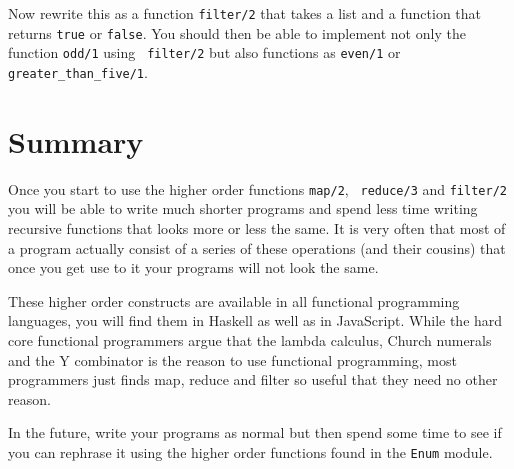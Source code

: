 \documentclass[a4paper,11pt]{article}
\begin{document}
Now rewrite this as a function {\tt filter/2} that takes a list and a
function that returns {\tt true} or {\tt false}. You should then be
able to implement not only the function {\tt odd/1} using {\tt
  filter/2} but also functions as {\tt even/1} or {\tt
  greater_than_five/1}.



\section*{Summary}

Once you start to use the higher order functions {\tt map/2}, {\tt
  reduce/3} and {\tt filter/2} you will be able to write much shorter
programs and spend less time writing recursive functions that looks
more or less the same. It is very often that most of a program actually
consist of a series of these operations (and their cousins) that once
you get use to it your programs will not look the same.

These higher order constructs are available in all functional
programming languages, you will find them in Haskell as well as in
JavaScript. While the hard core functional programmers argue that the
lambda calculus, Church numerals and the Y combinator is the reason to
use functional programming, most programmers just finds map, reduce and
filter so useful that they need no other reason.

In the future, write your programs as normal but then spend some time
to see if you can rephrase it using the higher order functions found
in the {\tt Enum} module.
\end{document}
